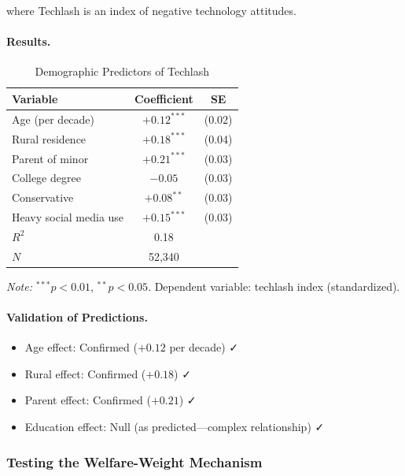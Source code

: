 where Techlash is an index of negative technology attitudes.

\paragraph{Results.}
\begin{table}[htbp]
\centering
\caption{Demographic Predictors of Techlash}
\label{tab:techlash-regression}
\begin{tabular}{@{}lcc@{}}
\toprule
\textbf{Variable} & \textbf{Coefficient} & \textbf{SE} \\
\midrule
Age (per decade) & $+0.12^{***}$ & (0.02) \\
Rural residence & $+0.18^{***}$ & (0.04) \\
Parent of minor & $+0.21^{***}$ & (0.03) \\
College degree & $-0.05$ & (0.03) \\
Conservative & $+0.08^{**}$ & (0.03) \\
Heavy social media use & $+0.15^{***}$ & (0.03) \\
\midrule
$R^2$ & 0.18 & \\
$N$ & 52,340 & \\
\bottomrule
\end{tabular}
\begin{flushleft}
\small\textit{Note:} $^{***}p<0.01$, $^{**}p<0.05$. Dependent variable: techlash index (standardized).
\end{flushleft}
\end{table}

\paragraph{Validation of Predictions.}
\begin{itemize}
    \item Age effect: Confirmed ($+0.12$ per decade) ✓
    \item Rural effect: Confirmed ($+0.18$) ✓
    \item Parent effect: Confirmed ($+0.21$) ✓
    \item Education effect: Null (as predicted---complex relationship) ✓
\end{itemize}

\subsubsection{Testing the Welfare-Weight Mechanism}

